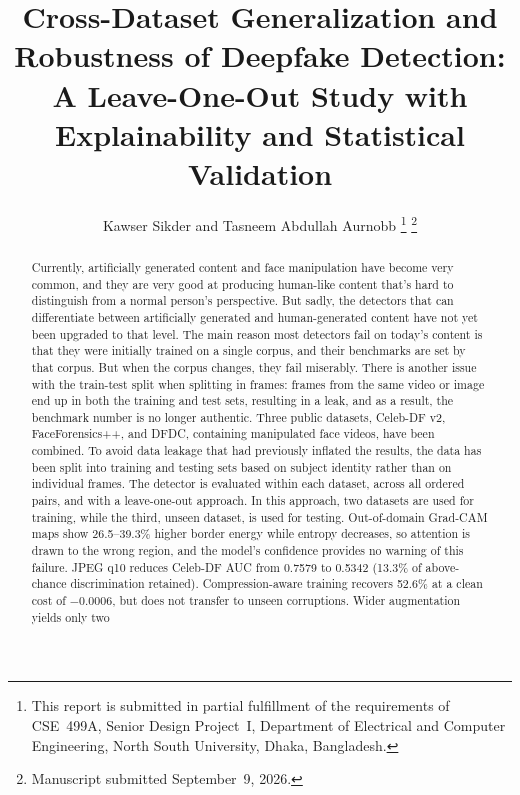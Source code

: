 \documentclass[journal,onecolumn]{IEEEtran}
\begin{document}
\title{Cross-Dataset Generalization and Robustness of Deepfake Detection:\\
A Leave-One-Out Study with Explainability and Statistical Validation}

\author{%
  Kawser Sikder
  and Tasneem Abdullah Aurnobb
  \thanks{This report is submitted in partial fulfillment of the requirements of
  CSE~499A, Senior Design Project~I, Department of Electrical and Computer
  Engineering, North South University, Dhaka, Bangladesh.}%
  \thanks{Manuscript submitted September~9, 2026.}%
}

\maketitle

\begin{abstract}
Currently, artificially generated content and face manipulation have become
very common, and they are very good at producing human-like content that's hard
to distinguish from a normal person's perspective. But sadly, the detectors
that can differentiate between artificially generated and human-generated content
have not yet been upgraded to that level. The main reason most detectors fail
on today's content is that they were initially trained on a single corpus, and
their benchmarks are set by that corpus. But when the corpus changes, they fail
miserably. There is another issue with the train-test split when splitting in
frames: frames from the same video or image end up in both the training and
test sets, resulting in a leak, and as a result, the benchmark number is no
longer authentic. Three public datasets, Celeb-DF v2, FaceForensics++, and
DFDC, containing manipulated face videos, have been combined. To avoid data
leakage that had previously inflated the results, the data has been split into
training and testing sets based on subject identity rather than on individual
frames. The detector is evaluated within each dataset, across all ordered
pairs, and with a leave-one-out approach. In this approach, two datasets are
used for training, while the third, unseen dataset, is used for testing. Out-of-domain
Grad-CAM maps show 26.5--39.3\% higher border energy while entropy
decreases, so attention is drawn to the wrong
region, and the model's confidence provides no warning of this failure. JPEG
q10 reduces Celeb-DF AUC from 0.7579 to 0.5342
(13.3\% of above-chance discrimination retained). Compression-aware training
recovers 52.6\% at a clean cost of $-$0.0006, but
does not transfer to unseen corruptions. Wider augmentation yields only two

\end{abstract}
\end{document}
